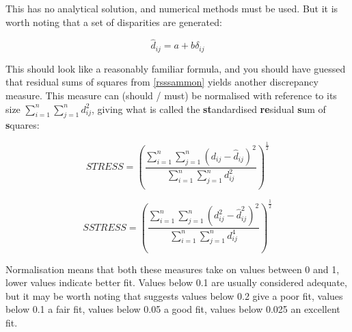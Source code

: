 This has no analytical solution, and numerical methods must be used.   But it is worth noting that a set of disparities are generated:

\begin{equation}
\label{rsssammon}
\hat{d}_{ij} = a + b \delta_{ij}
\end{equation}

This should look like a reasonably familiar formula, and you should have guessed that residual sums of squares from \ref{rsssammon} yields another discrepancy measure.   This measure can (should / must) be normalised with reference to its size $\sum_{i=1}^{n} \sum_{j=1}^{n} d_{ij}^{2}$, giving what is called the \textbf{st}andardised \textbf{re}sidual \textbf{s}um of \textbf{s}quares:

\begin{equation}
STRESS = \left( \frac{\sum_{i=1}^{n} \sum_{j=1}^{n} (d_{ij} - \hat{d}_{ij})^{2}}{\sum_{i=1}^{n} \sum_{j=1}^{n} d_{ij}^{2}} \right) ^{\frac{1}{2}}
\end{equation}


\begin{equation}
SSTRESS = \left( \frac{\sum_{i=1}^{n} \sum_{j=1}^{n} (d_{ij}^{2} - \hat{d}_{ij}^{2})^{2}}{\sum_{i=1}^{n} \sum_{j=1}^{n} d_{ij}^{4}} \right) ^{\frac{1}{2}}
\end{equation}

Normalisation means that both these measures take on values between 0 and 1, lower values indicate better fit.   Values below 0.1 are usually considered adequate, but it may be worth noting that \cite{Kruskal:1964a} suggests values below 0.2 give a poor fit, values below 0.1 a fair fit, values below 0.05 a good fit, values below 0.025 an excellent fit.



















